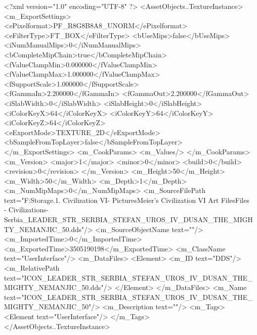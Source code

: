 <?xml version="1.0" encoding="UTF-8" ?>
<AssetObjects..TextureInstance>
	<m_ExportSettings>
		<ePixelformat>PF_R8G8B8A8_UNORM</ePixelformat>
		<eFilterType>FT_BOX</eFilterType>
		<bUseMips>false</bUseMips>
		<iNumManualMips>0</iNumManualMips>
		<bCompleteMipChain>true</bCompleteMipChain>
		<fValueClampMin>0.000000</fValueClampMin>
		<fValueClampMax>1.000000</fValueClampMax>
		<fSupportScale>1.000000</fSupportScale>
		<fGammaIn>2.200000</fGammaIn>
		<fGammaOut>2.200000</fGammaOut>
		<iSlabWidth>0</iSlabWidth>
		<iSlabHeight>0</iSlabHeight>
		<iColorKeyX>64</iColorKeyX>
		<iColorKeyY>64</iColorKeyY>
		<iColorKeyZ>64</iColorKeyZ>
		<eExportMode>TEXTURE_2D</eExportMode>
		<bSampleFromTopLayer>false</bSampleFromTopLayer>
	</m_ExportSettings>
	<m_CookParams>
		<m_Values/>
	</m_CookParams>
	<m_Version>
		<major>1</major>
		<minor>0</minor>
		<build>0</build>
		<revision>0</revision>
	</m_Version>
	<m_Height>50</m_Height>
	<m_Width>50</m_Width>
	<m_Depth>1</m_Depth>
	<m_NumMipMaps>0</m_NumMipMaps>
	<m_SourceFilePath text="F:\Mod Storage\2.1. Civilization VI\Mods\Archive - Pictures\Sid Meier's Civilization VI Art Files\Art Files - Civilizations\Civilization - Serbia\ICON_LEADER_STR_SERBIA_STEFAN_UROS_IV_DUSAN_THE_MIGHTY_NEMANJIC_50.dds"/>
	<m_SourceObjectName text=""/>
	<m_ImportedTime>0</m_ImportedTime>
	<m_ExportedTime>3505190198</m_ExportedTime>
	<m_ClassName text="UserInterface"/>
	<m_DataFiles>
		<Element>
			<m_ID text="DDS"/>
			<m_RelativePath text="ICON_LEADER_STR_SERBIA_STEFAN_UROS_IV_DUSAN_THE_MIGHTY_NEMANJIC_50.dds"/>
		</Element>
	</m_DataFiles>
	<m_Name text="ICON_LEADER_STR_SERBIA_STEFAN_UROS_IV_DUSAN_THE_MIGHTY_NEMANJIC_50"/>
	<m_Description text=""/>
	<m_Tags>
		<Element text="UserInterface"/>
	</m_Tags>
</AssetObjects..TextureInstance>

